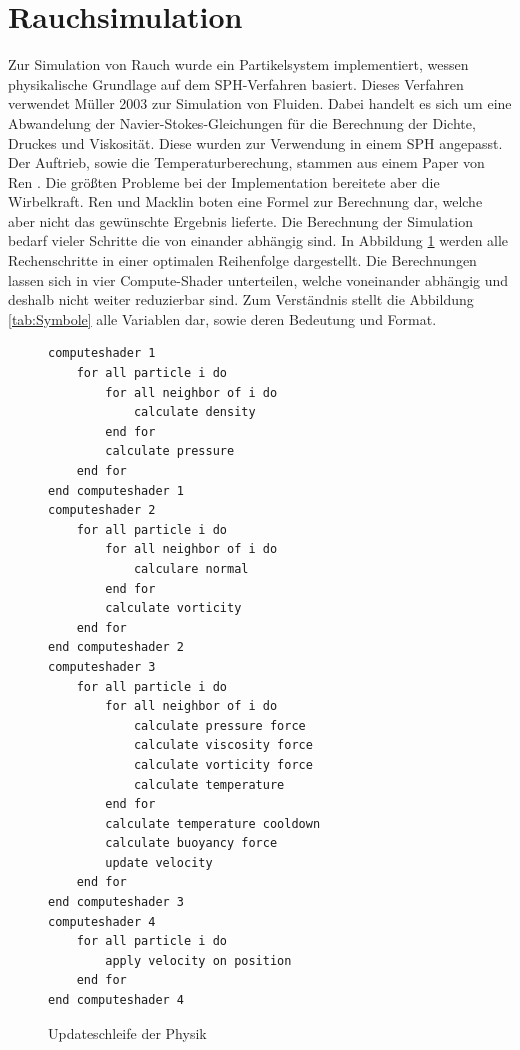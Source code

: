 \documentclass[intern,palatino]{cgBA}
\begin{document}

\section{Rauchsimulation}\label{rauch}

Zur Simulation von Rauch wurde ein Partikelsystem implementiert, wessen physikalische Grundlage auf dem SPH-Verfahren basiert. Dieses Verfahren verwendet Müller \cite{muller2003particle} 2003 zur Simulation von Fluiden. Dabei handelt es sich um eine Abwandelung der Navier-Stokes-Gleichungen für die Berechnung der Dichte, Druckes und Viskosität. Diese wurden zur Verwendung in einem SPH angepasst. Der Auftrieb, sowie die Temperaturberechung, stammen aus einem Paper von Ren \cite{ren2016fast}. Die größten Probleme bei der Implementation bereitete aber die Wirbelkraft. Ren und Macklin \cite{macklin2014unified} boten eine Formel zur Berechnung dar, welche aber nicht das gewünschte Ergebnis lieferte.
\newline
Die Berechnung der Simulation bedarf vieler Schritte die von einander abhängig sind. In Abbildung  \ref{code:sim} werden alle Rechenschritte in einer optimalen Reihenfolge dargestellt. Die Berechnungen lassen sich in vier Compute-Shader unterteilen, welche voneinander abhängig und deshalb nicht weiter reduzierbar sind.
\newline
Zum Verständnis stellt die Abbildung \ref{tab:Symbole} alle Variablen dar, sowie deren Bedeutung und Format.

\begin{figure} [H]
	\centering
	\begin{lstlisting}
computeshader 1	
	for all particle i do
		for all neighbor of i do
			calculate density
		end for
		calculate pressure
	end for
end computeshader 1
computeshader 2
	for all particle i do
		for all neighbor of i do
			calculare normal
		end for
		calculate vorticity
	end for
end computeshader 2
computeshader 3
	for all particle i do
		for all neighbor of i do
			calculate pressure force
			calculate viscosity force
			calculate vorticity force
			calculate temperature
		end for
		calculate temperature cooldown
		calculate buoyancy force
		update velocity
	end for
end computeshader 3
computeshader 4
	for all particle i do
		apply velocity on position
	end for
end computeshader 4
	\end{lstlisting}
	\caption{Updateschleife der Physik}
	\label{code:sim}
\end{figure}
\end{document}
